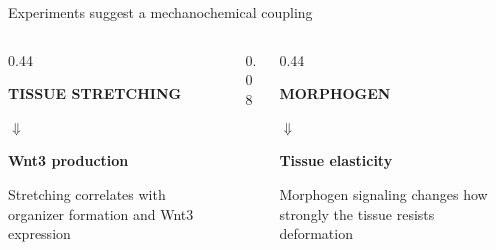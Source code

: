 \begin{frame}{Experiments suggest a mechanochemical coupling}

  \vspace{0.10cm}

  \begin{columns}[c,onlytextwidth]
    \begin{column}{0.44\textwidth}
      \centering
      {\color{HydraGold}\bfseries\fontsize{9.2}{11}\selectfont TISSUE STRETCHING\par}
      \vspace{0.32cm}
      {\color{HydraCyan}\fontsize{19}{19}\selectfont $\Downarrow$}
      \vspace{0.28cm}
      {\color{HydraWhite}\bfseries\fontsize{11.5}{14}\selectfont Wnt3 production\par}
      \vspace{0.24cm}
      {\color{HydraMuted}\fontsize{7.3}{9}\selectfont
        Stretching correlates with organizer formation and Wnt3 expression
      \par}
    \end{column}

    \begin{column}{0.08\textwidth}
      \centering{\color{HydraLine}\fontsize{30}{30}\selectfont $\vert$}
    \end{column}

    \begin{column}{0.44\textwidth}
      \centering
      {\color{HydraWhite}\bfseries\fontsize{11.5}{14}\selectfont MORPHOGEN\par}
      \vspace{0.32cm}
      {\color{HydraCyan}\fontsize{19}{19}\selectfont $\Downarrow$}
      \vspace{0.28cm}
      {\color{HydraGreen}\bfseries\fontsize{10.2}{12.5}\selectfont Tissue elasticity\par}
      \vspace{0.24cm}
      {\color{HydraMuted}\fontsize{7.3}{9}\selectfont
        Morphogen signaling changes how strongly the tissue resists deformation
      \par}
    \end{column}
  \end{columns}

  \vspace{0.92cm}

\end{frame}


